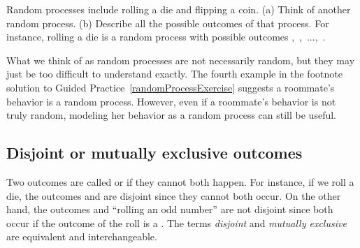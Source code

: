 \begin{exercisewrap}
\begin{nexercise} \label{randomProcessExercise}
Random processes include rolling a die and flipping a coin. (a) Think of another random process. (b) Describe all the possible outcomes of that process. For instance, rolling a die is a random process with possible outcomes \mbox{, , ..., }.\footnotemark
\end{nexercise}
\end{exercisewrap}

What we think of as random processes are not necessarily random, but they may just be too difficult to understand exactly. The fourth example in the footnote solution to Guided Practice~\ref{randomProcessExercise} suggests a roommate's behavior is a random process. However, even if a roommate's behavior is not truly random, modeling her behavior as a random process can still be useful. 



\subsection{Disjoint or mutually exclusive outcomes}


Two outcomes are called  or  if they cannot both happen. For instance, if we roll a die, the outcomes  and  are disjoint since they cannot both occur. On the other hand, the outcomes  and ``rolling an odd number'' are not disjoint since both occur if the outcome of the roll is a . The terms \emph{disjoint} and \emph{mutually exclusive} are equivalent and interchangeable.

